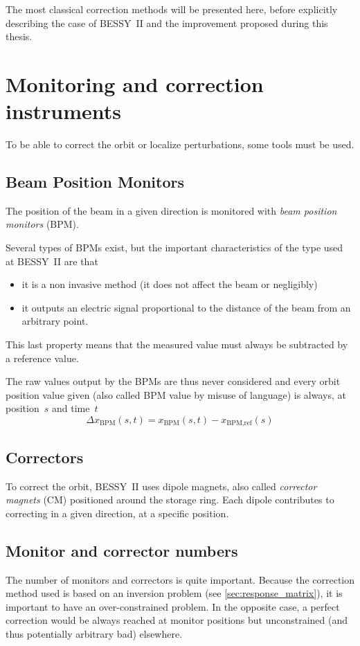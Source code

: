 The most classical correction methods will be presented here, before explicitly describing the case of BESSY~II and the improvement proposed during this thesis.

\section{Monitoring and correction instruments}
To be able to correct the orbit or localize perturbations, some tools must be used.

\subsection{Beam Position Monitors}
The position of the beam in a given direction is monitored with \emph{beam position monitors} (BPM).

Several types of BPMs exist, but the important characteristics of the type used at BESSY~II are that
\begin{itemize}
	\item it is a non invasive method (it does not affect the beam or negligibly)
	\item it outputs an electric signal proportional to the distance of the beam from an arbitrary point.
\end{itemize}

This last property means that the measured value must always be subtracted by a reference value.

The raw values output by the BPMs are thus never considered and every orbit position value given (also called BPM value by misuse of language) is always, at position~$s$ and time~$t$
\begin{equation}
\Delta x_\text{BPM}(s,t) = x_\text{BPM}(s,t) - x_\text{BPM,ref}(s)
\end{equation}

\subsection{Correctors}
To correct the orbit, BESSY~II uses dipole magnets, also called \emph{corrector magnets} (CM) positioned around the storage ring. Each dipole contributes to correcting in a given direction, at a specific position.

\subsection{Monitor and corrector numbers}
The number of monitors and correctors is quite important. Because the correction method used is based on an inversion problem (see \cref{sec:response_matrix}), it is important to have an over-constrained problem. In the opposite case, a perfect correction would be always reached at monitor positions but unconstrained (and thus potentially arbitrary bad) elsewhere.

